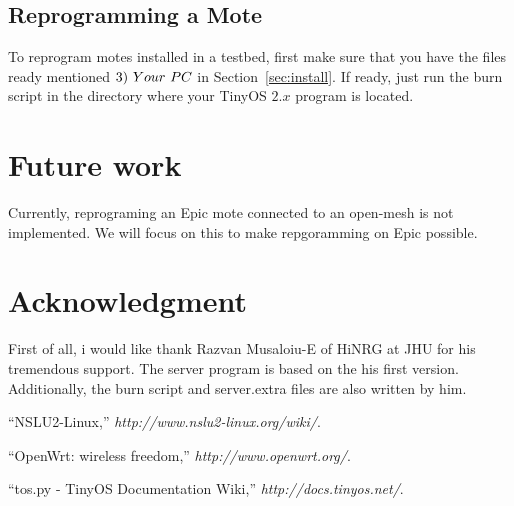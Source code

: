 \documentclass[10pt,conference]{IEEEtran}
\begin{document}
\subsection{Reprogramming a Mote}
To reprogram motes installed in a testbed, first make sure that you have the
files ready mentioned $3) \hspace{1.2mm}Your \hspace{1.2mm}PC$ in
Section~\ref{sec:install}. If ready, just run the burn script in the directory 
where your TinyOS $2.x$ program is located. 

\section{Future work}
Currently, reprograming an Epic mote connected to an open-mesh is not
implemented.  We will focus on this to make repgoramming on Epic possible.

\section*{Acknowledgment}
First of all, i would like thank Razvan Musaloiu-E of HiNRG at JHU for his
tremendous support.  The server program is based on the his first version.
Additionally, the burn script and server.extra files are also written by him.

\begin{thebibliography}{1}

``NSLU2-Linux,'' \emph{http://www.nslu2-linux.org/wiki/}. 

``OpenWrt: wireless freedom,'' \emph{http://www.openwrt.org/}. 

``tos.py - TinyOS Documentation Wiki,'' \emph{http://docs.tinyos.net/}. 

\end{thebibliography}

\end{document}
